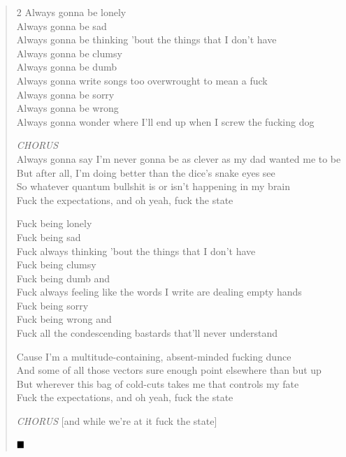 \documentclass[11pt]{book}
\begin{document}
\begin{verse}
\begin{multicols}{2}
\tiny
Always gonna be lonely \\
Always gonna be sad \\
Always gonna be thinking 'bout the things that I don't have \\
Always gonna be clumsy \\
Always gonna be dumb \\
Always gonna write songs too overwrought to mean a fuck \\
Always gonna be sorry \\
Always gonna be wrong \\
Always gonna wonder where I'll end up when I screw the fucking dog

\hspace{2em} \emph{CHORUS} \\
\hspace{2em} Always gonna say I'm never gonna be as clever as my dad wanted me to be \\
\hspace{2em} But after all, I'm doing better than the dice's snake eyes see \\
\hspace{2em} So whatever quantum bullshit is or isn't happening in my brain \\
\hspace{2em} Fuck the expectations, and oh yeah, fuck the state

Fuck being lonely \\
Fuck being sad \\
Fuck always thinking 'bout the things that I don't have \\
Fuck being clumsy \\
Fuck being dumb and \\
Fuck always feeling like the words I write are dealing empty hands \\
Fuck being sorry \\
Fuck being wrong and \\
Fuck all the condescending bastards that'll never understand

\hspace{2em} Cause I'm a multitude-containing, absent-minded fucking dunce \\
\hspace{2em} And some of all those vectors sure enough point elsewhere than but up \\
\hspace{2em} But wherever this bag of cold-cuts takes me that controls my fate \\
\hspace{2em} Fuck the expectations, and oh yeah, fuck the state

\hspace{2em} \emph{CHORUS} [and while we're at it fuck the state]

$\hfill\blacksquare$

\end{multicols}
\end{verse}
\end{document}
